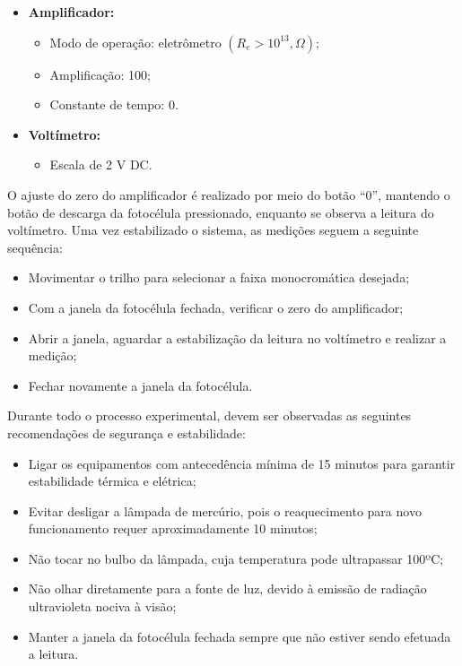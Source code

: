 \documentclass[10pt,twocolumn,letterpaper]{article}
\begin{document}
\begin{itemize}
    \item \textbf{Amplificador:}
    \begin{itemize}
        \item Modo de operação: eletrômetro $(R_e > 10^{13}, \Omega)$;
        \item Amplificação: 100;
        \item Constante de tempo: 0.
    \end{itemize}

    \item \textbf{Voltímetro:}

    \begin{itemize}
        \item Escala de 2 V DC.
    \end{itemize}
\end{itemize}

\vspace{.25cm}

\hspace{1cm} O ajuste do zero do amplificador é realizado por meio do botão “0”, mantendo o botão de descarga da fotocélula pressionado, enquanto se observa a leitura do voltímetro.
Uma vez estabilizado o sistema, as medições seguem a seguinte sequência:

\begin{itemize}
    \item Movimentar o trilho para selecionar a faixa monocromática desejada;
    \item Com a janela da fotocélula fechada, verificar o zero do amplificador;
    \item Abrir a janela, aguardar a estabilização da leitura no voltímetro e realizar a medição;
    \item Fechar novamente a janela da fotocélula.
\end{itemize}

\vspace{.25cm}

\hspace{1cm} Durante todo o processo experimental, devem ser observadas as seguintes recomendações de segurança e estabilidade:

\begin{itemize}
    \item Ligar os equipamentos com antecedência mínima de 15 minutos para garantir estabilidade térmica e elétrica;
    \item Evitar desligar a lâmpada de mercúrio, pois o reaquecimento para novo funcionamento requer aproximadamente 10 minutos;
    \item Não tocar no bulbo da lâmpada, cuja temperatura pode ultrapassar 100ºC;
    \item Não olhar diretamente para a fonte de luz, devido à emissão de radiação ultravioleta nociva à visão;
    \item Manter a janela da fotocélula fechada sempre que não estiver sendo efetuada a leitura.
\end{itemize}
\end{document}
